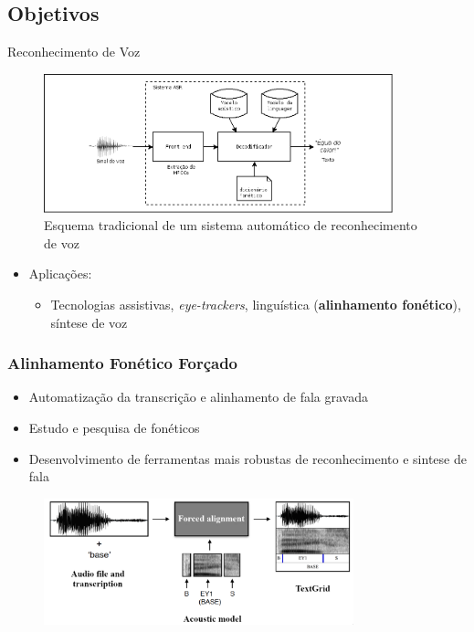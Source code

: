 \subsection{Objetivos}
\begin{frame}{Reconhecimento de Voz}

\begin{figure}
	\includegraphics[width=0.9\textwidth]{Figures/asr}
    \caption{Esquema tradicional de um sistema autom\'atico de reconhecimento de voz}
\end{figure}

\begin{itemize}
    \item Aplica\c c\~oes:
    \begin{itemize}
        \smallskip
		\item Tecnologias assistivas, \textit{eye-trackers}, lingu\'istica (\textbf{alinhamento fon\'etico}), s\'intese de voz
    \end{itemize}
\end{itemize}
\end{frame}


\begin{frame}
\frametitle{Alinhamento Fon\'etico For\c cado}
	\begin{itemize}
		\item Automatiza\c c\~ao  da transcri\c c\~ao e alinhamento de fala gravada
		\item Estudo e pesquisa de fon\'eticos
		\item Desenvolvimento de ferramentas mais robustas de reconhecimento e sintese de fala
	\end{itemize}
	\begin{figure}
	\begin{center}
		\includegraphics[width=0.8\textwidth]{Figures/align}
	\end{center}
	\end{figure}


\end{frame}


